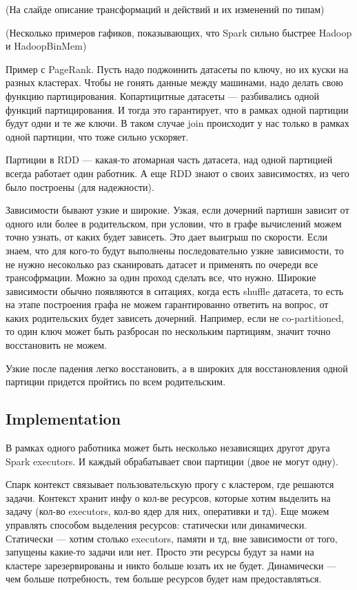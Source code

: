 \documentclass[12pt]{article}
\begin{document}
(На слайде описание трансформаций и действий и их изменений по типам)

(Несколько примеров гафиков, показывающих, что Spark сильно быстрее Hadoop и HadoopBinMem)

Пример с PageRank. Пусть надо поджоинить датасеты по ключу, но их куски на разных кластерах. Чтобы не гонять данные между машинами, надо делать свою функцию партицирования. Копартицитные датасеты --- разбивались одной функций партицирования. И тогда это гарантирует, что в рамках одной партиции будут одни и те же ключи. В таком случае join происходит у нас только в рамках одной партиции, что тоже сильно ускоряет.

Партиции в RDD --- какая-то атомарная часть датасета, над одной партицией всегда работает один работник. А еще RDD знают о своих зависимостях, из чего было построены (для надежности).

Зависимости бывают узкие и широкие. Узкая, если дочерний партишн зависит от одного или более в родительском, при условии, что в графе вычислений можем точно узнать, от каких будет зависеть. Это дает выигрыш по скорости. Если знаем, что для кого-то будут выполнены последовательно узкие зависимости, то не нужно несоколько раз сканировать датасет и применять по очереди все трансофрмации. Можно за один проход сделать все, что нужно. Широкие зависимости обычно появляются в ситациях, когда есть shuffle датасета, то есть на этапе построения графа не можем гарантированно ответить на вопрос, от каких родительских будет зависеть дочерний. Например, если не co-partitioned, то один ключ может быть разбросан по нескольким партициям, значит точно восстановить не можем. 

Узкие после падения легко восстановить, а в широких для восстановления одной партиции придется пройтись по всем родительским.
    
\subsection{Implementation} 

В рамках одного работника может быть несколько независящих другот друга Spark executors. И каждый обрабатывает свои партиции (двое не могут одну). 

Спарк контекст связывает пользовательскую прогу с кластером, где решаются задачи. Контекст хранит инфу о кол-ве ресурсов, которые хотим выделить на задачу (кол-во executors, кол-во ядер для них, оперативки и тд). Еще можем управлять способом выделения ресурсов: статически или динамически. Статически --- хотим столько executors, памяти и тд, вне зависимости от того, запущены какие-то задачи или нет. Просто эти ресурсы будут за нами на кластере зарезервированы и никто больше юзать их не будет. Динамически --- чем больше потребность, тем больше ресурсов будет нам предоставляться.
\end{document}
